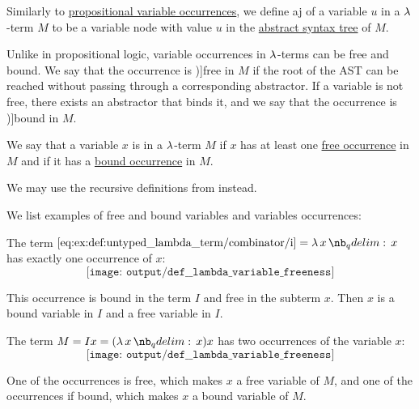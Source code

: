 \begin{definition}\label{def:lambda_variable_occurrence}\mimprovised
  Similarly to \hyperref[def:propositional_variable_occurrence]{propositional variable occurrences}, we define aj  of a variable \( u \) in a \( \mathrm{\lambda} \)-term \( M \) to be a variable node with value \( u \) in the \hyperref[def:untyped_lambda_term_ast]{abstract syntax tree} of \( M \).

  Unlike in propositional logic, variable occurrences in \( \mathrm{\lambda} \)-terms can be free and bound. We say that the occurrence is \term[ru=свободное (вхождение) (\cite[64]{Герасимов2011})]{free} in \( M \) if the root of the AST can be reached without passing through a corresponding abstractor. If a variable is not free, there exists an abstractor that binds it, and we say that the occurrence is \term[ru=связанное (вхождение) (\cite[64]{Герасимов2011})]{bound} in \( M \).
\end{definition}

\begin{definition}\label{def:lambda_variable_freeness}\mimprovised
  We say that a variable \( x \) is  in a \( \mathrm{\lambda} \)-term \( M \) if \( x \) has at least one \hyperref[def:lambda_variable_occurrence]{free occurrence} in \( M \) and  if it has a \hyperref[def:lambda_variable_occurrence]{bound occurrence} in \( M \).
\end{definition}
\begin{comments}
  \item We may use the recursive definitions from  instead.
\end{comments}

\begin{example}\label{ex:def:lambda_variable_freeness}
  We list examples of free and bound variables and variables occurrences:
  \begin{thmenum}
     The term \( \ref{eq:ex:def:untyped_lambda_term/combinator/i} = \qabs x x \) has exactly one occurrence of \( x \):
    \begin{equation*}
      \texttt{[image: output/def\_\_lambda\_variable\_freeness]}
    \end{equation*}

     This occurrence is bound in the term \( I \) and free in the subterm \( x \). Then \( x \) is a bound variable in \( I \) and a free variable in \( I \).

     The term \( M = I x = (\qabs x x) x \) has two occurrences of the variable \( x \):
    \begin{equation*}
      \texttt{[image: output/def\_\_lambda\_variable\_freeness]}
    \end{equation*}

    One of the occurrences is free, which makes \( x \) a free variable of \( M \), and one of the occurrences if bound, which makes \( x \) a bound variable of \( M \).
  \end{thmenum}
\end{example}

